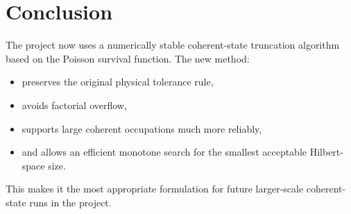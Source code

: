 \documentclass[12pt]{article}
\begin{document}
\section*{Conclusion}
The project now uses a numerically stable coherent-state truncation algorithm based on the Poisson survival function. The new method:
\begin{itemize}
\item preserves the original physical tolerance rule,
\item avoids factorial overflow,
\item supports large coherent occupations much more reliably,
\item and allows an efficient monotone search for the smallest acceptable Hilbert-space size.
\end{itemize}

This makes it the most appropriate formulation for future larger-scale coherent-state runs in the project.
\end{document}

